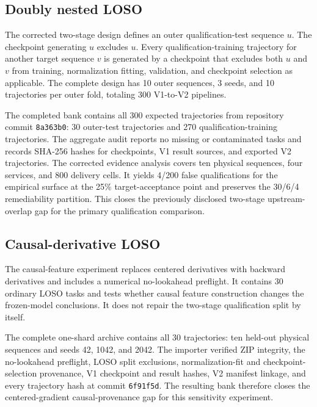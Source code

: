 \documentclass[journal,onecolumn]{IEEEtran}
\begin{document}
\subsection{Doubly nested LOSO}
The corrected two-stage design defines an outer qualification-test sequence $u$. The checkpoint generating $u$ excludes $u$. Every qualification-training trajectory for another target sequence $v$ is generated by a checkpoint that excludes both $u$ and $v$ from training, normalization fitting, validation, and checkpoint selection as applicable. The complete design has 10 outer sequences, 3 seeds, and 10 trajectories per outer fold, totaling 300 V1-to-V2 pipelines.

The completed bank contains all 300 expected trajectories from repository commit \texttt{8a363b0}: 30 outer-test trajectories and 270 qualification-training trajectories. The aggregate audit reports no missing or contaminated tasks and records SHA-256 hashes for checkpoints, V1 result sources, and exported V2 trajectories. The corrected evidence analysis covers ten physical sequences, four services, and 800 delivery cells. It yields 4/200 false qualifications for the empirical surface at the 25\% target-acceptance point and preserves the 30/6/4 remediability partition. This closes the previously disclosed two-stage upstream-overlap gap for the primary qualification comparison.

\subsection{Causal-derivative LOSO}
The causal-feature experiment replaces centered derivatives with backward derivatives and includes a numerical no-lookahead preflight. It contains 30 ordinary LOSO tasks and tests whether causal feature construction changes the frozen-model conclusions. It does not repair the two-stage qualification split by itself.

The complete one-shard archive contains all 30 trajectories: ten held-out physical sequences and seeds 42, 1042, and 2042. The importer verified ZIP integrity, the no-lookahead preflight, LOSO split exclusions, normalization-fit and checkpoint-selection provenance, V1 checkpoint and result hashes, V2 manifest linkage, and every trajectory hash at commit \texttt{6f91f5d}. The resulting bank therefore closes the centered-gradient causal-provenance gap for this sensitivity experiment.
\end{document}
